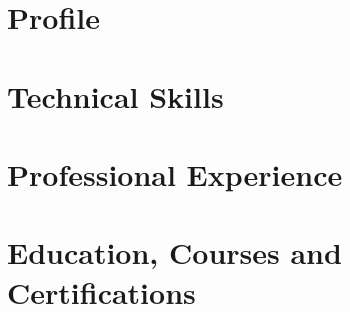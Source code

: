 \documentclass[10pt,a4paper,english]{article}
\begin{document}




\section*{Profile}


\section*{Technical Skills}


\section*{Professional Experience}


\section*{Education, Courses and Certifications}


%
\end{document}
